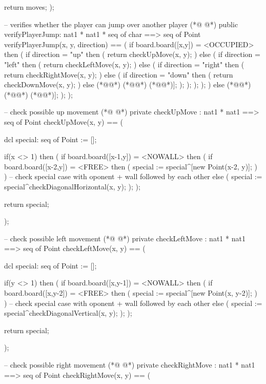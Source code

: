 \begin{vdmpp}[breaklines=true]
   return moves;
  );
  
  -- verifies whether the player can jump over another player
(*@
\label{verifyPlayerJump:212}
@*)
  public verifyPlayerJump: nat1 * nat1 * seq of char ==> seq of Point
  verifyPlayerJump(x, y, direction) ==
  (
   if board.board([x,y]) = <OCCUPIED>
   then
   (
    if direction = "up"
    then
    (
     return checkUpMove(x, y);
    )
    else
    (
     if direction = "left"
     then
     (
      return checkLeftMove(x, y);
     )
     else
     (
      if direction = "right"
      then
      (
       return checkRightMove(x, y);
      )
      else
      (
       if direction = "down"
       then
       (
        return checkDownMove(x, y);
       )
       else
       (*@\vdmnotcovered{(}@*)
        (*@@*) (*@\vdmnotcovered{[}@*)];
       );
      );
     );
    );
   )
   else
   (*@\vdmnotcovered{(}@*)
    (*@@*) (*@\vdmnotcovered{[}@*)];
   );
  );
  
  -- check possible up movement
(*@
\label{checkUpMove:259}
@*)
  private checkUpMove : nat1 * nat1 ==> seq of Point
  checkUpMove(x, y) ==
  (
  
   dcl special: seq of Point := [];
   
   if(x <> 1)
   then
   (
    if board.board([x-1,y]) = <NOWALL>
    then
    (
     if board.board([x-2,y]) = <FREE>
     then
     (
      special := special^[new Point(x-2, y)];
     )
    )
    -- check special case with oponent + wall followed by each other
    else
    (
     special := special^checkDiagonalHorizontal(x, y);
    );
   );
   
   return special;
    
  );
  
  -- check possible left movement
(*@
\label{checkLeftMove:289}
@*)
  private checkLeftMove : nat1 * nat1 ==> seq of Point
  checkLeftMove(x, y) ==
  (
   
   dcl special: seq of Point := [];
   
   if(y <> 1)
   then
   (
    if board.board([x,y-1]) = <NOWALL>
    then
    (
     if board.board([x,y-2]) = <FREE>
     then
     (
      special := special^[new Point(x, y-2)];
     )
    )
    -- check special case with oponent + wall followed by each other
    else
    (
     special := special^checkDiagonalVertical(x, y);
    );
   );
   
   return special;
   
  );
  
  -- check possible right movement
(*@
\label{checkRightMove:319}
@*)
  private checkRightMove : nat1 * nat1 ==> seq of Point
  checkRightMove(x, y) ==
  ( 
  

\end{vdmpp}
